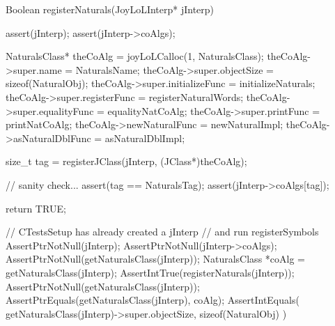 \startCCode
Boolean registerNaturals(JoyLoLInterp* jInterp) {
  assert(jInterp);
  assert(jInterp->coAlgs);
  
  NaturalsClass* theCoAlg        = joyLoLCalloc(1, NaturalsClass);
  theCoAlg->super.name           = NaturalsName;
  theCoAlg->super.objectSize     = sizeof(NaturalObj);
  theCoAlg->super.initializeFunc = initializeNaturals;
  theCoAlg->super.registerFunc   = registerNaturalWords;
  theCoAlg->super.equalityFunc   = equalityNatCoAlg;
  theCoAlg->super.printFunc      = printNatCoAlg;
  theCoAlg->newNaturalFunc       = newNaturalImpl;
  theCoAlg->asNaturalDblFunc     = asNaturalDblImpl;

  size_t tag =
    registerJClass(jInterp, (JClass*)theCoAlg);
  
  // sanity check...
  assert(tag == NaturalsTag);
  assert(jInterp->coAlgs[tag]);

  return TRUE;
}
\stopCCode


\startCTest
  // CTestsSetup has already created a jInterp
  // and run registerSymbols
  AssertPtrNotNull(jInterp);
  AssertPtrNotNull(jInterp->coAlgs);
  AssertPtrNotNull(getNaturalsClass(jInterp));
  NaturalsClass *coAlg = getNaturalsClass(jInterp);
  AssertIntTrue(registerNaturals(jInterp));
  AssertPtrNotNull(getNaturalsClass(jInterp));
  AssertPtrEquals(getNaturalsClass(jInterp), coAlg);
  AssertIntEquals(
    getNaturalsClass(jInterp)->super.objectSize,
    sizeof(NaturalObj)
  )
\stopCTest
\stopTestCase
\stopTestSuite
